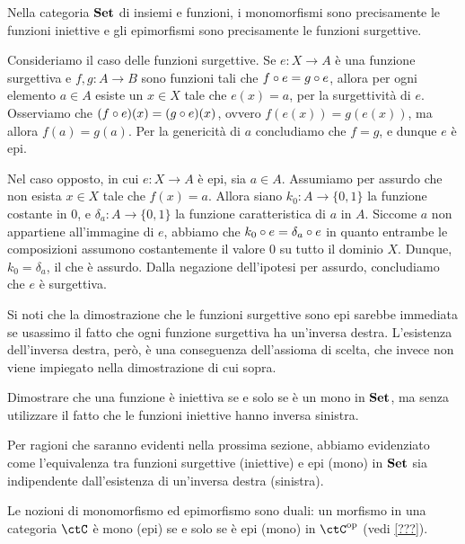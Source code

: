 \begin{example}
	Nella categoria \(\mathbf{Set}\) di insiemi e funzioni, i monomorfismi sono precisamente le funzioni iniettive
	e gli epimorfismi sono precisamente le funzioni surgettive.

	Consideriamo il caso delle funzioni surgettive.
	Se \(e \colon X \to A\) è una funzione surgettiva e \(f, g \colon A \to B\) sono funzioni tali che \(f \circ e = g \circ e\),
	allora per ogni elemento \(a \in A\) esiste un \(x \in X\) tale che \(e(x) = a\), per la surgettività di \(e\).
	Osserviamo che \((f \circ e)(x) = (g \circ e)(x)\), ovvero \(f(e(x)) = g(e(x))\),
	ma allora \(f(a) = g(a)\).
	Per la genericità di \(a\) concludiamo che \(f = g\), e dunque \(e\) è epi.

	Nel caso opposto, in cui \(e \colon X \to A\) è epi, sia \(a \in A\).
	Assumiamo per assurdo che non esista \(x \in X\) tale che \(f(x) = a\).
	Allora siano \(k_0 \colon A \to \{0, 1\}\) la funzione costante in \(0\),
	e \(\delta_a \colon A \to \{0, 1\}\) la funzione caratteristica di \(a\) in \(A\).
	Siccome \(a\) non appartiene all'immagine di \(e\), abbiamo che \(k_0 \circ e = \delta_a \circ e\)
	in quanto entrambe le composizioni assumono costantemente il valore \(0\) su tutto il dominio \(X\).
	Dunque, \(k_0 = \delta_a\), il che è assurdo.
	Dalla negazione dell'ipotesi per assurdo, concludiamo che \(e\) è surgettiva.
\end{example}

Si noti che la dimostrazione che le funzioni surgettive sono epi sarebbe immediata
se usassimo il fatto che ogni funzione surgettiva ha un'inversa destra.
L'esistenza dell'inversa destra, però, è una conseguenza dell'assioma di scelta,
che invece non viene impiegato nella dimostrazione di cui sopra.

\begin{exercise}
	Dimostrare che una funzione è iniettiva se e solo se è un mono in \(\mathbf{Set}\),
	ma senza utilizzare il fatto che le funzioni iniettive hanno inversa sinistra.
\end{exercise}

Per ragioni che saranno evidenti nella prossima sezione,
abbiamo evidenziato come l'equivalenza tra funzioni surgettive (iniettive)
e epi (mono) in \(\mathbf{Set}\) sia indipendente dall'esistenza di un'inversa destra (sinistra).

\begin{remark}
\label{rmk:mono-epi-duality}
Le nozioni di monomorfismo ed epimorfismo sono duali:
un morfismo in una categoria \(\ctC\) è mono (epi) se e solo se è epi (mono) in \(\ctC^{\op}\) (vedi \ref{???}).
\end{remark}

